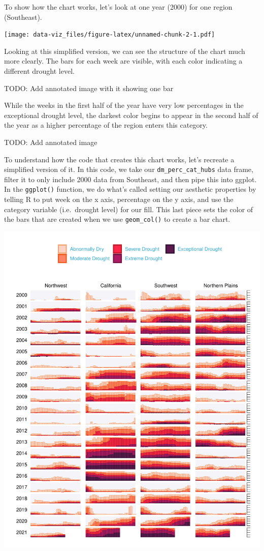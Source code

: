 \documentclass[
]{book}
\begin{document}
To show how the chart works, let's look at one year (2000) for one region (Southeast).

\texttt{[image: data-viz\_files/figure-latex/unnamed-chunk-2-1.pdf]}

Looking at this simplified version, we can see the structure of the chart much more clearly. The bars for each week are visible, with each color indicating a different drought level.

TODO: Add annotated image with it showing one bar

While the weeks in the first half of the year have very low percentages in the exceptional drought level, the darkest color begins to appear in the second half of the year as a higher percentage of the region enters this category.

TODO: Add annotated image

To understand how the code that creates this chart works, let's recreate a simplified version of it. In this code, we take our \texttt{dm\_perc\_cat\_hubs} data frame, filter it to only include 2000 data from Southeast, and then pipe this into ggplot. In the \texttt{ggplot()} function, we do what's called setting our aesthetic properties by telling R to put week on the x axis, percentage on the y axis, and use the category variable (i.e.~drought level) for our fill. This last piece sets the color of the bars that are created when we use \texttt{geom\_col()} to create a bar chart.

\includegraphics{data-viz_files/figure-latex/unnamed-chunk-3-1.pdf}
\end{document}
